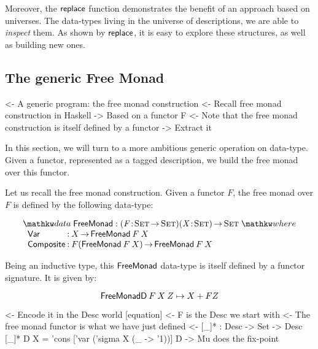 Moreover, the $\F{replace}$ function demonstrates the benefit of an
approach based on universes. The data-types living in the universe of
descriptions, we are able to \emph{inspect} them. As shown by
$\F{replace}$, it is easy to explore these structures, as well as
building new ones.

\subsection{The generic Free Monad}
\label{sec:desc-free-monad}

\begin{wstructure}
<- A generic program: the free monad construction
    <- Recall free monad construction in Haskell
        -> Based on a functor F
    <- Note that the free monad construction is itself defined by a functor
        -> Extract it
\end{wstructure}

In this section, we will turn to a more ambitious generic operation on
data-type. Given a functor, represented as a tagged description, we
build the free monad over this functor.

\newcommand{\FMFreeMonad}{\D{FreeMonad}}
\newcommand{\FMFreeMonadD}{\D{FreeMonadD}}
\newcommand{\FMVar}{\C{Var}}
\newcommand{\FMComposite}{\C{Composite}}

Let us recall the free monad construction. Given a functor $F$, the
free monad over $F$ is defined by the following data-type:

\[
\stk{
\data \FMFreeMonad : \PITEL{\V{F}}{\Set \To \Set} 
                     \PI{\V{X}}{\Set} 
                     \Set 
\where \\
\;\;\begin{array}{@{}l@{\::\:}l@{\quad}l}
    \FMVar           & X \To \FMFreeMonad\: F\: X                            \\
    \FMComposite     & F (\FMFreeMonad\: F\: X) \To \FMFreeMonad\: F\: X    
\end{array}
}
\]


Being an inductive type, this $\FMFreeMonad$ data-type is itself
defined by a functor signature. It is given by:

\[
\FMFreeMonadD\: F\: X\: Z \mapsto X + F Z
\]

\begin{wstructure}
    <- Encode it in the Desc world [equation]
        <- F is the Desc we start with
        <- The free monad functor is what we have just defined
        <- [\_]* : Desc -> Set -> Desc
           [\_]* D X = 'cons ['var ('sigma X (\_ -> '1))] D
        -> Mu does the fix-point
\end{wstructure}

